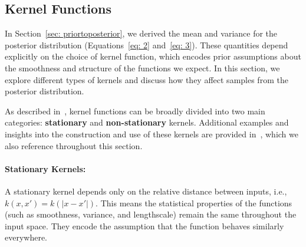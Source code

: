 \documentclass{article}
\begin{document}
\subsection{Kernel Functions}
\label{sec: Kernels}
In Section~\ref{sec: priortoposterior}, we derived the mean and variance for the posterior distribution (Equations~\ref{eq: 2} and~\ref{eq: 3}). These quantities depend explicitly on the choice of kernel function, which encodes prior assumptions about the smoothness and structure of the functions we expect. In this section, we explore different types of kernels and discuss how they affect samples from the posterior distribution.

\noindent
As described in~\cite{rasmussen2006gaussian}, kernel functions can be broadly divided into two main categories: \textbf{stationary} and \textbf{non-stationary} kernels. Additional examples and insights into the construction and use of these kernels are provided in~\cite{duvenaud2014kernel}, which we also reference throughout this section.

\paragraph{Stationary Kernels:}  
A stationary kernel depends only on the relative distance between inputs, i.e., \( k(x, x') = k(|x - x'|) \). This means the statistical properties of the functions (such as smoothness, variance, and lengthscale) remain the same throughout the input space. They encode the assumption that the function behaves similarly everywhere.
\end{document}
